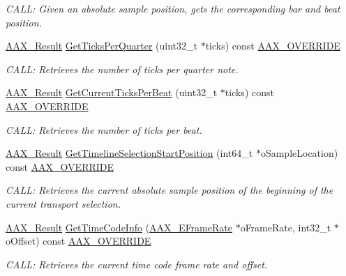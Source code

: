 \begin{DoxyCompactItemize}
\begin{DoxyCompactList}\small\item\em C\+A\+LL\+: Given an absolute sample position, gets the corresponding bar and beat position. \end{DoxyCompactList}\item 
\mbox{\hyperlink{a00392_a4d8f69a697df7f70c3a8e9b8ee130d2f}{A\+A\+X\+\_\+\+Result}} \mbox{\hyperlink{a01941_abe58c0dec6b49b78d9634da7cb2fa8d7}{Get\+Ticks\+Per\+Quarter}} (uint32\+\_\+t $\ast$ticks) const \mbox{\hyperlink{a00392_ac2f24a5172689ae684344abdcce55463}{A\+A\+X\+\_\+\+O\+V\+E\+R\+R\+I\+DE}}
\begin{DoxyCompactList}\small\item\em C\+A\+LL\+: Retrieves the number of ticks per quarter note. \end{DoxyCompactList}\item 
\mbox{\hyperlink{a00392_a4d8f69a697df7f70c3a8e9b8ee130d2f}{A\+A\+X\+\_\+\+Result}} \mbox{\hyperlink{a01941_a8df039482006decb5fa07cd464cdf402}{Get\+Current\+Ticks\+Per\+Beat}} (uint32\+\_\+t $\ast$ticks) const \mbox{\hyperlink{a00392_ac2f24a5172689ae684344abdcce55463}{A\+A\+X\+\_\+\+O\+V\+E\+R\+R\+I\+DE}}
\begin{DoxyCompactList}\small\item\em C\+A\+LL\+: Retrieves the number of ticks per beat. \end{DoxyCompactList}\item 
\mbox{\hyperlink{a00392_a4d8f69a697df7f70c3a8e9b8ee130d2f}{A\+A\+X\+\_\+\+Result}} \mbox{\hyperlink{a01941_a0d7fbac53fc8237cdf097de474bc30b9}{Get\+Timeline\+Selection\+Start\+Position}} (int64\+\_\+t $\ast$o\+Sample\+Location) const \mbox{\hyperlink{a00392_ac2f24a5172689ae684344abdcce55463}{A\+A\+X\+\_\+\+O\+V\+E\+R\+R\+I\+DE}}
\begin{DoxyCompactList}\small\item\em C\+A\+LL\+: Retrieves the current absolute sample position of the beginning of the current transport selection. \end{DoxyCompactList}\item 
\mbox{\hyperlink{a00392_a4d8f69a697df7f70c3a8e9b8ee130d2f}{A\+A\+X\+\_\+\+Result}} \mbox{\hyperlink{a01941_af0501383f3cee8962c0d29c9bc32de53}{Get\+Time\+Code\+Info}} (\mbox{\hyperlink{a00491_a1271a51553bf508de59864334111aa8f}{A\+A\+X\+\_\+\+E\+Frame\+Rate}} $\ast$o\+Frame\+Rate, int32\+\_\+t $\ast$o\+Offset) const \mbox{\hyperlink{a00392_ac2f24a5172689ae684344abdcce55463}{A\+A\+X\+\_\+\+O\+V\+E\+R\+R\+I\+DE}}
\begin{DoxyCompactList}\small\item\em C\+A\+LL\+: Retrieves the current time code frame rate and offset. \end{DoxyCompactList}\item 

\end{DoxyCompactItemize}
